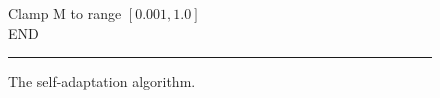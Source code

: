 \begin{figure}[htbp]
\begin{center}
\begin{varwidth}{\textwidth}
{\tab Clamp M to range $[0.001,1.0]$ \\
END \\
}
\end{varwidth}
\end{center}
\centering
\rule{35em}{0.5pt}
\caption[Self-adaptation Algorithm]{The self-adaptation algorithm.}
\label{fig:sa}
\end{figure}


